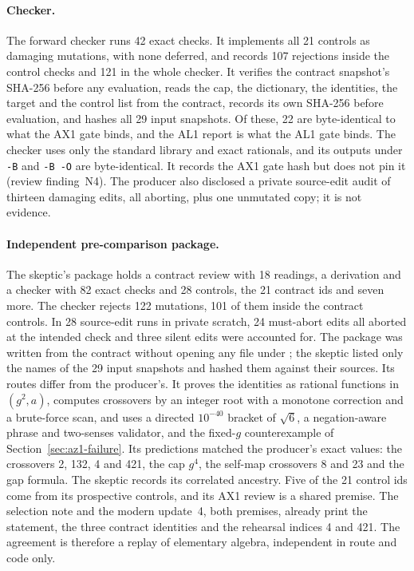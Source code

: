 \paragraph{Checker.}
The forward checker runs 42 exact checks. It implements all 21 controls as
damaging mutations, with none deferred, and records 107 rejections inside the
control checks and 121 in the whole checker. It verifies the contract
snapshot's SHA-256 before any evaluation, reads the cap, the dictionary, the
identities, the target and the control list from the contract, records its
own SHA-256 before evaluation, and hashes all 29 input snapshots. Of these,
22 are byte-identical to what the AX1 gate binds, and the AL1 report is what
the AL1 gate binds. The checker uses only the standard library and exact
rationals, and its outputs under \texttt{-B} and \texttt{-B -O} are
byte-identical. It records the AX1 gate hash but does not pin it (review
finding~N4). The producer also disclosed a private source-edit audit of
thirteen damaging edits, all aborting, plus one unmutated copy; it is not
evidence.

\paragraph{Independent pre-comparison package.}
The skeptic's package holds a contract review with 18 readings, a derivation
and a checker with 82 exact checks and 28 controls, the 21 contract ids and
seven more. The checker rejects 122 mutations, 101 of them inside the
contract controls. In 28 source-edit runs in private scratch, 24 must-abort
edits all aborted at the intended check and three silent edits were
accounted for. The package was written from the contract without opening any
file under ; the skeptic listed only the names of
the 29 input snapshots and hashed them against their sources. Its routes
differ from the producer's. It proves the identities as rational functions in
$(g^2,a)$, computes crossovers by an integer root with a monotone correction
and a brute-force scan, and uses a directed $10^{-40}$ bracket of $\sqrt6$, a
negation-aware phrase and two-senses validator, and the fixed-$g$
counterexample of Section~\ref{sec:az1-failure}. Its predictions matched the
producer's exact values: the crossovers 2, 132, 4 and 421, the cap $g^4$, the
self-map crossovers 8 and 23 and the gap formula. The skeptic records its
correlated ancestry. Five of the 21 control ids come from its prospective
controls, and its AX1 review is a shared premise. The selection note and the
modern update~4, both premises, already print the statement, the three
contract identities and the rehearsal indices 4 and 421. The agreement is
therefore a replay of elementary algebra, independent in route and code only.

